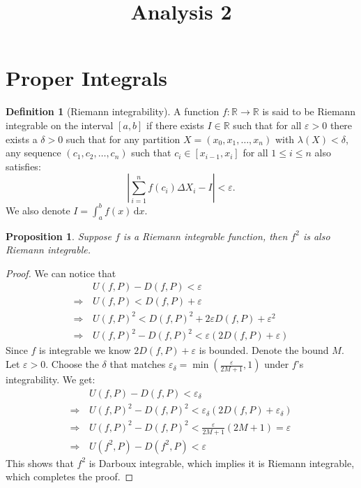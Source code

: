 \documentclass[11pt,a4paper]{article}
\title{\textbf{Analysis 2}}
\author{}
\date{}
\theoremstyle{definition}
\newtheorem{definition}{Definition}[section]
\theoremstyle{plain}
\newtheorem{proposition}[theorem]{Proposition}
\newcommand\dx    {\,\mathrm{d}x}
\newcommand{\R}{\mathbb{R}}
\newcommand{\abs}[1]{\left\lvert #1\right\rvert}
\begin{document}
	\maketitle
	\newpage
  \section{Proper Integrals}
  \begin{definition}[Riemann integrability]
    A function $f \colon \R \to \R$ is said to be Riemann integrable on the 
    interval $[a,b]$ if there exists $I \in \R$ such that for all 
    $\varepsilon > 0$ there exists a $\delta > 0$ such that 
    for any partition $X = (x_0,x_1,\dots,x_n)$ with $\lambda(X) < \delta$, 
    any sequence $(c_1,c_2,\ldots,c_n)$ such that $c_i \in[x_{i-1},x_i]$ for
    all $1 \le i \le n$ also satisfies:
    \[
      \abs{\sum_{i=1}^{n}{f(c_i)\Delta X_i} - I} < \varepsilon.
	  \]
    We also denote $I = \int_{a}^{b} f(x)\dx$.
  \end{definition}
  \begin{proposition}
	  Suppose $f$ is a Riemann integrable function,
    then $f^2$ is also Riemann integrable.
  \end{proposition}
  \begin{proof}
    We can notice that
    \begin{align*}
      &U(f,P) - D(f,P) < \varepsilon \\
      \Rightarrow\, &U(f,P) < D(f,P) + \varepsilon \\
      \Rightarrow\, &U(f,P)^2<D(f,P)^2 + 2\varepsilon D(f,P) + \varepsilon^2 \\
      \Rightarrow\, &U(f,P)^2 - D(f,P)^2 < \varepsilon (2D(f,P) + \varepsilon)
    \end{align*}	
    Since $f$ is integrable we know $2D(f,P) + \varepsilon$ is bounded.
    Denote the bound $M$.
    Let $\varepsilon > 0$.
    Choose the $\delta$ that matches 
    $\varepsilon_{\delta} = \min(\frac{\varepsilon}{2M+1},1)$ 
    under $f$'s integrability.
    We get:
      \begin{align*}
        &U(f,P) - D(f,P) < \varepsilon_{\delta} \\
        \Rightarrow\, &U(f,P)^2 - D(f,P)^2 <
          \varepsilon_{\delta} (2D(f,P) + \varepsilon_{\delta}) \\
        \Rightarrow\, &U(f,P)^2 - D(f,P)^2 <
          \frac{\varepsilon}{2M+1} (2M + 1) = \varepsilon \\
        \Rightarrow\, &U(f^2,P) - D(f^2,P) < \varepsilon
      \end{align*}	
    This shows that $f^2$ is Darboux integrable, which implies
    it is Riemann integrable, which completes the proof.
  \end{proof}
\end{document}
